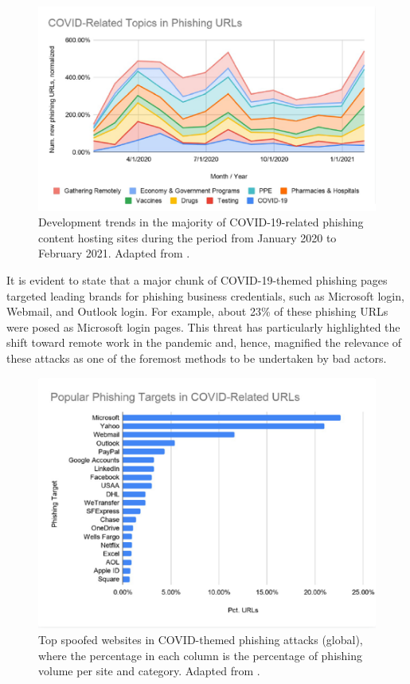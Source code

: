 \captionsetup{font= footnotesize}
\begin{figure}[H]
    \centering
    \includegraphics[width=0.8\linewidth]{background/CovidPhising.png}
    \caption{Development trends in the majority of COVID-19-related phishing content hosting sites during the period from January 2020 to February 2021. Adapted from \cite{Unit42AtricleCovidPhishing2021}.}
    \label{fig:figFourteen}
\end{figure}

It is evident to state that a major chunk of COVID-19-themed phishing pages targeted leading brands for phishing business credentials, such as Microsoft login, Webmail, and Outlook login. For example, about 23\% of these phishing URLs were posed as Microsoft login pages. This threat has particularly highlighted the shift toward remote work in the pandemic and, hence, magnified the relevance of these attacks as one of the foremost methods to be undertaken by bad actors.


\captionsetup{font= footnotesize}
\begin{figure}[H]
    \centering
    \includegraphics[width=0.8\linewidth]{background/TOPCOVIDURLS.png}
    \caption{Top spoofed websites in COVID-themed phishing attacks (global), where the percentage in each column is the percentage of phishing volume per site and category. Adapted from \cite{Unit42AtricleCovidPhishing2021}.}
    \label{fig:figFiveteen}
\end{figure}

